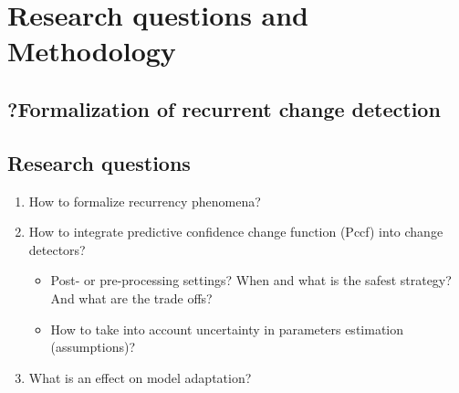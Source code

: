 \chapter{Research questions and Methodology}

\section{?Formalization of recurrent change detection}


\section{Research questions}


\begin{enumerate}
  \item How to formalize recurrency phenomena?
  \item How to integrate predictive confidence change function (Pccf) into change detectors?
  \begin{itemize}
    \item Post- or pre-processing settings? When and what is the safest strategy? And what are the trade offs?
    \item How to take into account uncertainty in parameters estimation (assumptions)?
  \end{itemize}
  \item What is an effect on model adaptation?
\end{enumerate}


